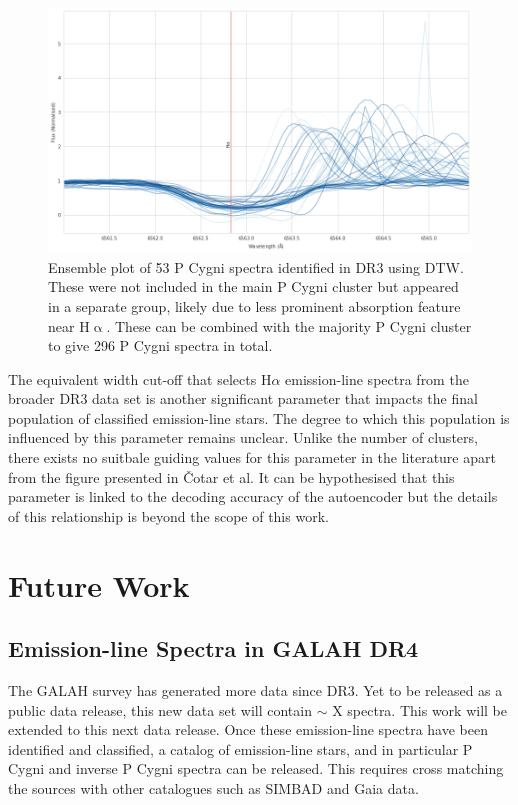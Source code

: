 \begin{figure}[!htb]
\centering
\includegraphics[scale=0.45]{figures/p cugni 2.png}
\caption{Ensemble plot of 53 P Cygni spectra identified in DR3 using DTW. These were not included in the main P Cygni cluster but appeared in a separate group, likely due to less prominent absorption feature near H$\upalpha$. These can be combined with the majority P Cygni cluster to give 296 P Cygni spectra in total.}
\end{figure}

The equivalent width cut-off that selects H$\alpha$ emission-line spectra from the broader DR3 data set is another significant parameter that impacts the final population of classified emission-line stars. The degree to which this population is influenced by this parameter remains unclear. Unlike the number of clusters, there exists no suitbale guiding values for this parameter in the literature apart from the figure presented in Čotar et al. It can be hypothesised that this parameter is linked to the decoding accuracy of the autoencoder but the details of this relationship is beyond the scope of this work.



\section{Future Work}

\subsection{Emission-line Spectra in GALAH DR4}

The GALAH survey has generated more data since DR3. Yet to be released as a public data release, this new data set will contain $\sim$ X spectra. This work will be extended to this next data release. Once these emission-line spectra have been identified and classified, a catalog of emission-line stars, and in particular P Cygni and inverse P Cygni spectra can be released. This requires cross matching the sources with other catalogues such as SIMBAD and Gaia data.

